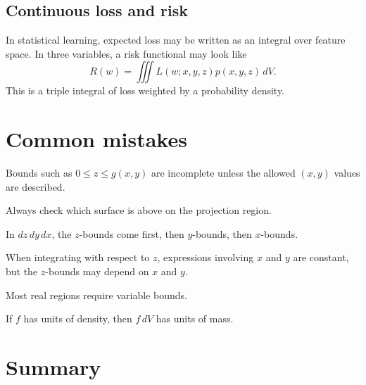 \documentclass[11pt]{article}
\begin{document}
\subsection*{Continuous loss and risk}
In statistical learning, expected loss may be written as an integral over feature space. In three variables, a risk functional may look like
\[
R(w)=\iiint L(w;x,y,z)p(x,y,z)\,dV.
\]
This is a triple integral of loss weighted by a probability density.

\section{Common mistakes}

\begin{warningbox}
Bounds such as $0\le z\le g(x,y)$ are incomplete unless the allowed $(x,y)$ values are described.
\end{warningbox}

\begin{warningbox}
Always check which surface is above on the projection region.
\end{warningbox}

\begin{warningbox}
In $dz\,dy\,dx$, the $z$-bounds come first, then $y$-bounds, then $x$-bounds.
\end{warningbox}

\begin{warningbox}
When integrating with respect to $z$, expressions involving $x$ and $y$ are constant, but the $z$-bounds may depend on $x$ and $y$.
\end{warningbox}

\begin{warningbox}
Most real regions require variable bounds.
\end{warningbox}

\begin{warningbox}
If $f$ has units of density, then $f\,dV$ has units of mass.
\end{warningbox}

\section{Summary}
\end{document}

